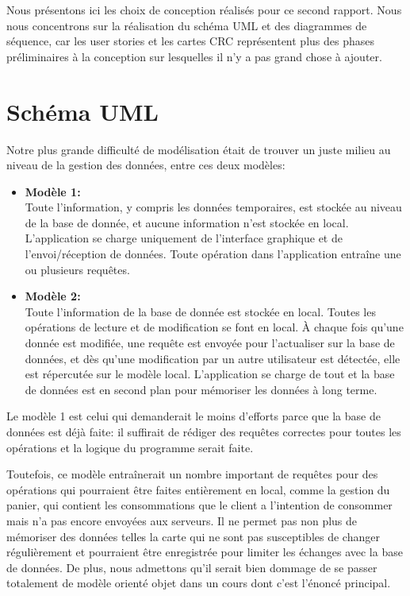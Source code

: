 \documentclass[a4paper,11pt]{article}
\begin{document}

Nous présentons ici les choix de conception réalisés pour ce second rapport.
Nous nous concentrons sur la réalisation du schéma UML et des diagrammes de séquence, car les user stories et les cartes CRC représentent plus des phases préliminaires à la conception sur lesquelles il n'y a pas grand chose à ajouter.

\section{Schéma UML}

Notre plus grande difficulté de modélisation était de trouver un juste milieu au niveau de la gestion des données, entre ces deux modèles:
\begin{itemize}
    \item \textbf{Modèle 1:}\\ Toute l'information, y compris les données temporaires, est stockée au niveau de la base de donnée, et aucune information n'est stockée en local. L'application se charge uniquement de l'interface graphique et de l'envoi/réception de données. Toute opération dans l'application entraîne une ou plusieurs requêtes.
    \item \textbf{Modèle 2:}\\ Toute l'information de la base de donnée est stockée en local. Toutes les opérations de lecture et de modification se font en local. À chaque fois qu'une donnée est modifiée, une requête est envoyée pour l'actualiser sur la base de données, et dès qu'une modification par un autre utilisateur est détectée, elle est répercutée sur le modèle local. L'application se charge de tout et la base de données est en second plan pour mémoriser les données à long terme.
\end{itemize}

Le modèle 1 est celui qui demanderait le moins d'efforts parce que la base de données est déjà faite: il suffirait de rédiger des requêtes correctes pour toutes les opérations et la logique du programme serait faite.

Toutefois, ce modèle entraînerait un nombre important de requêtes pour des opérations qui pourraient être faites entièrement en local, comme la gestion du panier, qui contient les consommations que le client a l'intention de consommer mais n'a pas encore envoyées aux serveurs. Il ne permet pas non plus de mémoriser des données telles la carte qui ne sont pas susceptibles de changer régulièrement et pourraient être enregistrée pour limiter les échanges avec la base de données. De plus, nous admettons qu'il serait bien dommage de se passer totalement de modèle orienté objet dans un cours dont c'est l'énoncé principal.
\end{document}
